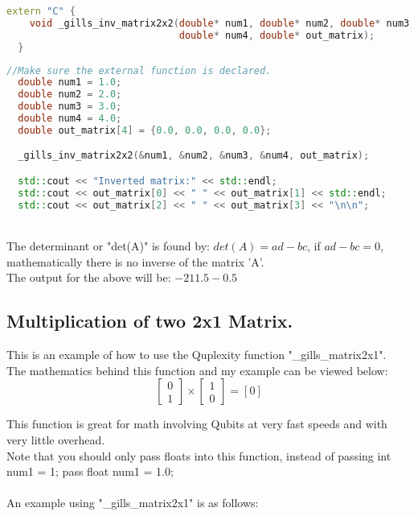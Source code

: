 \documentclass{article}
\begin{document}
\begin{lstlisting}[language=C++, frame=single]
  extern "C" {
    void _gills_inv_matrix2x2(double* num1, double* num2, double* num3, 
                              double* num4, double* out_matrix);
  }
\end{lstlisting}


\begin{lstlisting}[language=C++, frame=single]
  //Make sure the external function is declared.
  double num1 = 1.0;
  double num2 = 2.0;
  double num3 = 3.0;
  double num4 = 4.0;
  double out_matrix[4] = {0.0, 0.0, 0.0, 0.0};

  _gills_inv_matrix2x2(&num1, &num2, &num3, &num4, out_matrix);

  std::cout << "Inverted matrix:" << std::endl;
  std::cout << out_matrix[0] << " " << out_matrix[1] << std::endl;
  std::cout << out_matrix[2] << " " << out_matrix[3] << "\n\n";

\end{lstlisting}

\noindent \\ The determinant or "det(A)" is found by: $det(A) = ad - bc$, if $ad - bc = 0$, mathematically there is no inverse of the matrix 'A'. \\
The output for the above will be: $-2 1 1.5 -0.5$ \\

\subsection*{Multiplication of two 2x1 Matrix.}
This is an example of how to use the Quplexity function "\_gills\_matrix2x1". \\
The mathematics behind this function and my example can be viewed below: \\

\[
\begin{bmatrix}
0 \\
1
\end{bmatrix}
\times
\begin{bmatrix}
1 \\
0
\end{bmatrix}
= [0]
\]

\noindent This function is great for math involving Qubits at very fast speeds and with very little overhead. \\
Note that you should only pass floats into this function, instead of passing int num1 = 1; pass float num1 = 1.0;  \\\\
An example using "\_gills\_matrix2x1" is as follows: \\
\end{document}
